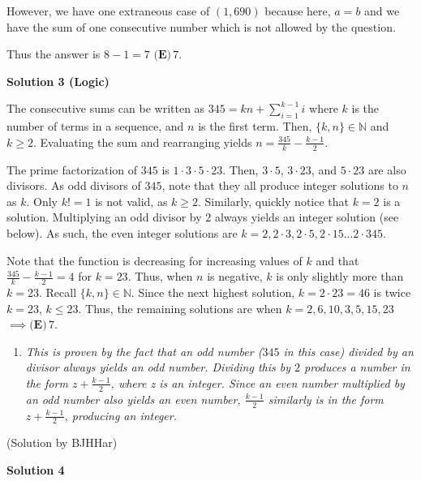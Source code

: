\begin{enumerate}
 However, we have one extraneous case of $(1,690)$ because here, $a=b$ and we have the sum of one consecutive number which is not allowed by the question.

 Thus the answer is $8-1=7$
$\boxed{\textbf{(E)} \,7}$.

 



\textbf{Solution 3 (Logic)}

The consecutive sums can be written as $345=kn+\sum_{i=1}^{k-1}{i}$ where $k$ is the number of terms in a sequence, and $n$ is the first term. Then, $\{k,n\}\in \mathbb{N}$ and $k\geq2$. Evaluating the sum and rearranging yields $n=\frac{345}{k}-\frac{k-1}{2}$. 

 
The prime factorization of $345$ is $1\cdot3\cdot5\cdot23$. Then, $3\cdot5$, $3\cdot23$, and $5\cdot23$ are also divisors.  As odd divisors of $345$, note that they all produce integer solutions to $n$ as $k$. Only $k!=1$ is not valid, as $k\geq2$. Similarly, quickly notice that $k=2$ is a solution. Multiplying an odd divisor by $2$ always yields an integer solution (see below). As such, the even integer solutions are $k=2, 2\cdot3, 2\cdot5, 2\cdot15 ... 2\cdot345$.

 
Note that the function is decreasing for increasing values of $k$ and that $\frac{345}{k}-\frac{k-1}{2}=4$ for $k=23$. Thus, when $n$ is negative, $k$ is only slightly more than $k=23$. Recall $\{k,n\}\in \mathbb{N}$. Since the next highest solution, $k=2\cdot23=46$ is twice $k=23$, $k\leq23$. Thus, the remaining solutions are when $k=2,6,10,3,5,15,23$ $\implies \boxed{\textbf{(E)} \,7}$.

 


 
            \begin{enumerate}[label=(\roman*)]
                \item \textit{This is proven by the fact that an odd number ($345$ in this case) divided by an divisor always yields an odd number. Dividing this by $2$ produces a number in the form $z+\frac{k-1}{2}$, where z is an integer. Since an even number multiplied by an odd number also yields an even number, $\frac{k-1}{2}$ similarly is in the form $z+\frac{k-1}{2}$, producing an integer.}
            \end{enumerate}
            (Solution by BJHHar)

 



\textbf{Solution 4}


\end{enumerate}
